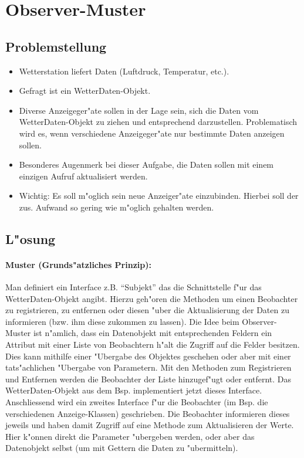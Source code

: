 \section{Observer-Muster}
\subsection{Problemstellung}
\begin{itemize}
	\item Wetterstation liefert Daten (Luftdruck, Temperatur, etc.).
	\item Gefragt ist ein WetterDaten-Objekt. 
	\item Diverse Anzeigeger"ate sollen in der Lage sein, sich die Daten vom WetterDaten-Objekt zu ziehen 
und entsprechend darzustellen. Problematisch wird es, wenn verschiedene Anzeigeger"ate nur 
bestimmte Daten anzeigen sollen. 
	\item Besonderes Augenmerk bei dieser Aufgabe, die Daten sollen mit einem einzigen Aufruf 
aktualisiert werden. 
	\item Wichtig: Es soll m"oglich sein neue Anzeiger"ate einzubinden. Hierbei soll der zus. Aufwand so 
gering wie m"oglich gehalten werden. 
\end{itemize}

\subsection{L"osung}
\paragraph{Muster (Grunds"atzliches Prinzip):}
Man definiert ein Interface z.B. \enquote{Subjekt} das die Schnittstelle f"ur das WetterDaten-Objekt 
angibt. Hierzu geh"oren die Methoden um einen Beobachter zu registrieren, zu entfernen oder 
diesen "uber die Aktualisierung der Daten zu informieren (bzw. ihm diese zukommen zu lassen). Die 
Idee beim Observer-Muster ist n"amlich, dass ein Datenobjekt mit entsprechenden Feldern ein 
Attribut mit einer Liste von Beobachtern h"alt die Zugriff auf die Felder besitzen. Dies kann 
mithilfe einer "Ubergabe des Objektes geschehen oder aber mit einer tats"achlichen "Ubergabe von 
Parametern. Mit den Methoden zum Registrieren und Entfernen werden die Beobachter der Liste 
hinzugef"ugt oder entfernt. Das WetterDaten-Objekt aus dem Bsp. implementiert jetzt dieses 
Interface. Anschliessend wird ein zweites Interface f"ur die Beobachter (im Bsp. die 
verschiedenen Anzeige-Klassen) geschrieben. Die Beobachter informieren dieses jeweils und haben 
damit Zugriff auf eine Methode zum Aktualisieren der Werte. Hier k"onnen direkt die Parameter 
"ubergeben werden, oder aber das Datenobjekt selbst (um mit Gettern die Daten zu "ubermitteln). 

